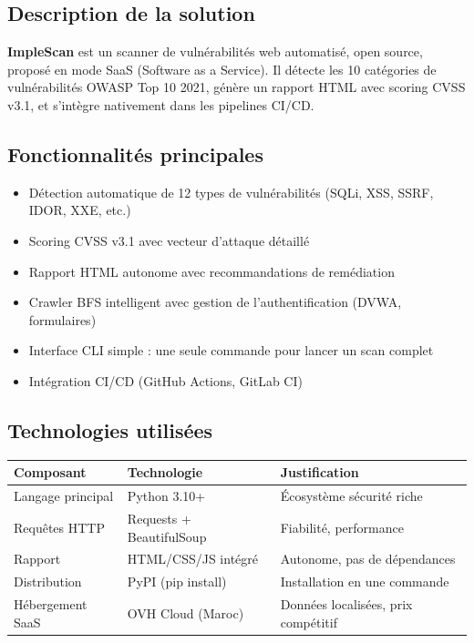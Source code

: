 \documentclass[12pt,a4paper]{report}
\newcommand{\hdr}[1]{\cellcolor{gray!15}\textbf{#1}}
\newcommand{\rowA}{\rowcolor{gray!8}}
\begin{document}
\subsection{Description de la solution}

\textbf{ImpleScan} est un scanner de vulnérabilités web automatisé, open source, proposé en mode SaaS (Software as a Service). Il détecte les 10 catégories de vulnérabilités OWASP Top 10 2021, génère un rapport HTML avec scoring CVSS v3.1, et s'intègre nativement dans les pipelines CI/CD.

\subsection{Fonctionnalités principales}

\begin{itemize}
  \item Détection automatique de 12 types de vulnérabilités (SQLi, XSS, SSRF, IDOR, XXE, etc.)
  \item Scoring CVSS v3.1 avec vecteur d'attaque détaillé
  \item Rapport HTML autonome avec recommandations de remédiation
  \item Crawler BFS intelligent avec gestion de l'authentification (DVWA, formulaires)
  \item Interface CLI simple : une seule commande pour lancer un scan complet
  \item Intégration CI/CD (GitHub Actions, GitLab CI)
\end{itemize}

\subsection{Technologies utilisées}

\begin{table}[H]
\centering
\begin{tabular}{p{4cm}p{4cm}p{4cm}}
\toprule
\hdr{Composant} & \hdr{Technologie} & \hdr{Justification} \\
\midrule
Langage principal & Python 3.10+ & Écosystème sécurité riche \\
\rowA Requêtes HTTP & Requests + BeautifulSoup & Fiabilité, performance \\
Rapport & HTML/CSS/JS intégré & Autonome, pas de dépendances \\
\rowA Distribution & PyPI (pip install) & Installation en une commande \\
Hébergement SaaS & OVH Cloud (Maroc) & Données localisées, prix compétitif \\
\bottomrule
\end{tabular}
\end{table}
\end{document}
